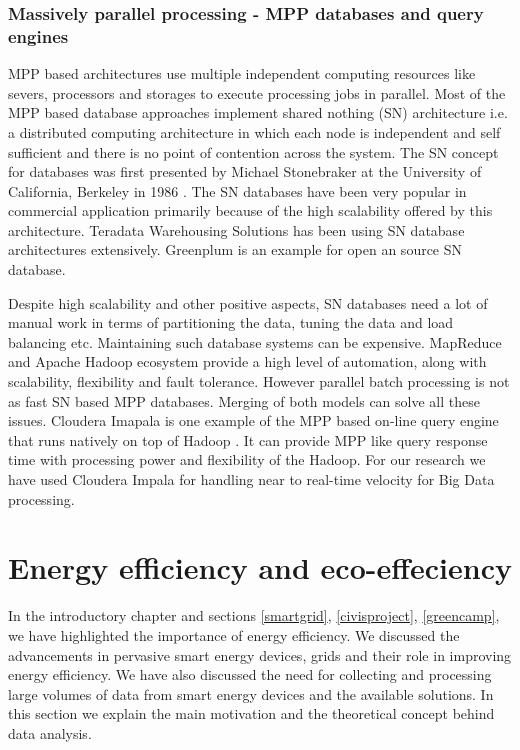 \subsubsection{Massively parallel processing - MPP databases and query engines}\label{mpp}
MPP based architectures use multiple independent computing resources like severs, processors and storages to execute processing jobs in parallel. Most of the MPP based database approaches implement shared nothing (SN) architecture i.e. a distributed computing architecture in which each node is independent and self sufficient and there is no point of contention across the system. The SN concept for databases was first presented by Michael Stonebraker at the University of California, Berkeley in 1986 \cite{stonebraker1986case}. The SN databases have been very popular in commercial application primarily because of the high scalability offered by this architecture. Teradata Warehousing Solutions has been using SN database architectures extensively. Greenplum is an example for open an source SN database.

Despite high scalability and other positive aspects, SN databases need a lot of manual work in terms of partitioning the data, tuning the data and load balancing etc. Maintaining such database systems can be expensive. MapReduce and Apache Hadoop ecosystem provide a high level of automation, along with scalability, flexibility and fault tolerance. However parallel batch processing is not as fast SN based MPP databases. Merging of both models can solve all these issues. Cloudera Imapala is one example of the MPP based on-line query engine that runs natively on top of Hadoop \cite{ clouderaimpala}. It can provide MPP like query response time with processing power and flexibility of the Hadoop. For our research we have used Cloudera Impala for handling near to real-time velocity for Big Data processing.

\section{Energy efficiency and eco-effeciency} \label{ecoeff}
In the introductory chapter and sections \ref{smartgrid}, \ref{civisproject}, \ref{greencamp}, we have highlighted the importance of energy efficiency. We discussed the advancements in pervasive smart energy devices, grids and their role in improving energy efficiency.  We have also discussed the need for collecting and processing large volumes of data from smart energy devices and the available solutions. In this section we explain the main motivation and the theoretical concept behind data analysis.  

